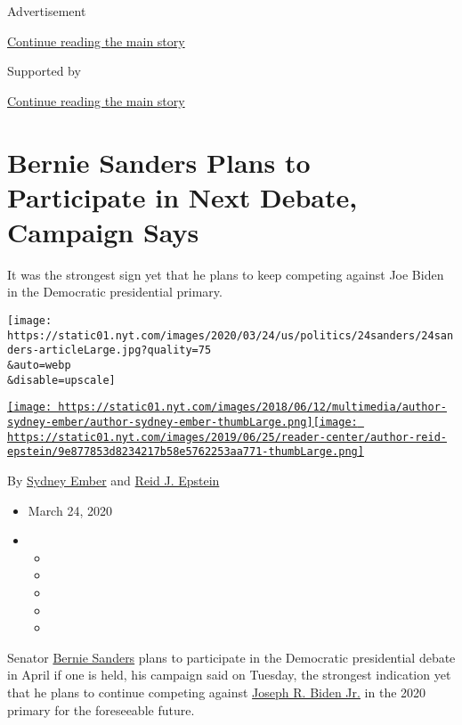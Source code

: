 Advertisement

\protect\hyperlink{after-top}{Continue reading the main story}

Supported by

\protect\hyperlink{after-sponsor}{Continue reading the main story}

\hypertarget{bernie-sanders-plans-to-participate-in-next-debate-campaign-says}{%
\section{Bernie Sanders Plans to Participate in Next Debate, Campaign
Says}\label{bernie-sanders-plans-to-participate-in-next-debate-campaign-says}}

It was the strongest sign yet that he plans to keep competing against
Joe Biden in the Democratic presidential primary.

\texttt{[image: https://static01.nyt.com/images/2020/03/24/us/politics/24sanders/24sanders-articleLarge.jpg?quality=75\\\&auto=webp\\\&disable=upscale]}

\href{https://www.nytimes.com/by/sydney-ember}{\texttt{[image: https://static01.nyt.com/images/2018/06/12/multimedia/author-sydney-ember/author-sydney-ember-thumbLarge.png]}}\href{https://www.nytimes.com/by/reid-j-epstein}{\texttt{[image: https://static01.nyt.com/images/2019/06/25/reader-center/author-reid-epstein/9e877853d8234217b58e5762253aa771-thumbLarge.png]}}

By \href{https://www.nytimes.com/by/sydney-ember}{Sydney Ember} and
\href{https://www.nytimes.com/by/reid-j-epstein}{Reid J. Epstein}

\begin{itemize}
\item
  March 24, 2020
\item
  \begin{itemize}
  \item
  \item
  \item
  \item
  \item
  \end{itemize}
\end{itemize}

Senator
\href{https://www.nytimes.com/interactive/2020/us/elections/bernie-sanders.html}{Bernie
Sanders} plans to participate in the Democratic presidential debate in
April if one is held, his campaign said on Tuesday, the strongest
indication yet that he plans to continue competing against
\href{https://www.nytimes.com/interactive/2020/us/elections/joe-biden.html}{Joseph
R. Biden Jr.} in the 2020 primary for the foreseeable future.

